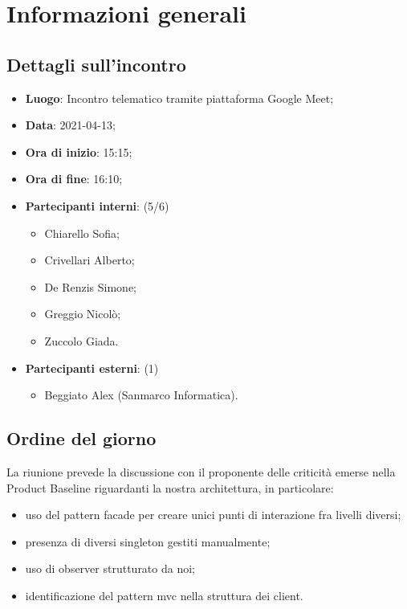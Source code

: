\section{Informazioni generali}

\subsection{Dettagli sull'incontro}
\begin{itemize}
\item \textbf{Luogo}: Incontro telematico tramite piattaforma Google Meet;
\item \textbf{Data}: 2021-04-13;
\item \textbf{Ora di inizio}: 15:15;
\item \textbf{Ora di fine}: 16:10;
\item \textbf{Partecipanti interni}: (5/6)
\begin{itemize}
	\item Chiarello Sofia;
	\item Crivellari Alberto;
	\item De Renzis Simone;
	\item Greggio Nicolò;
	\item Zuccolo Giada.
\end{itemize}
\item \textbf{Partecipanti esterni}: (1)
\begin{itemize}
	\item Beggiato Alex (Sanmarco Informatica).
\end{itemize}
\end{itemize}

\subsection{Ordine del giorno}

La riunione prevede la discussione con il proponente delle criticità emerse nella Product Baseline riguardanti la nostra architettura, in particolare:
\begin{itemize}
    \item uso del pattern facade per creare unici punti di interazione fra livelli diversi;
    \item presenza di diversi singleton gestiti manualmente;
    \item uso di observer strutturato da noi;
    \item identificazione del pattern mvc nella struttura dei client.
\end{itemize}





